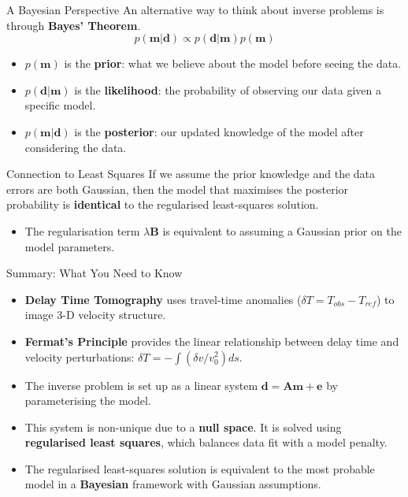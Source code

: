 \documentclass{beamer}
\begin{document}

\begin{frame}{A Bayesian Perspective}
    An alternative way to think about inverse problems is through \textbf{Bayes' Theorem}.
    $$ p(\mathbf{m}|\mathbf{d}) \propto p(\mathbf{d}|\mathbf{m})p(\mathbf{m}) $$
    \pause
    \begin{itemize}
        \item $ p(\mathbf{m}) $ is the \textbf{prior}: what we believe about the model before seeing the data.
        \item $ p(\mathbf{d}|\mathbf{m}) $ is the \textbf{likelihood}: the probability of observing our data given a specific model.
        \item $ p(\mathbf{m}|\mathbf{d}) $ is the \textbf{posterior}: our updated knowledge of the model after considering the data.
    \end{itemize}
    \pause
    \begin{alertblock}{Connection to Least Squares}
        If we assume the prior knowledge and the data errors are both Gaussian, then the model that maximises the posterior probability is \textbf{identical} to the regularised least-squares solution.
        \begin{itemize}
            \item The regularisation term $ \lambda\mathbf{B} $ is equivalent to assuming a Gaussian prior on the model parameters.
        \end{itemize}
    \end{alertblock}
\end{frame}


\begin{frame}{Summary: What You Need to Know}
    \begin{itemize}
        \item \textbf{Delay Time Tomography} uses travel-time anomalies ($ \delta T = T_{obs} - T_{ref} $) to image 3-D velocity structure.
        \pause
        \item \textbf{Fermat's Principle} provides the linear relationship between delay time and velocity perturbations: $ \delta T = -\int (\delta v / v_0^2) ds $.
        \pause
        \item The inverse problem is set up as a linear system $ \mathbf{d} = \mathbf{A}\mathbf{m} + \mathbf{e} $ by parameterising the model.
        \pause
        \item This system is non-unique due to a \textbf{null space}. It is solved using \textbf{regularised least squares}, which balances data fit with a model penalty.
        \pause
        \item The regularised least-squares solution is equivalent to the most probable model in a \textbf{Bayesian} framework with Gaussian assumptions.
    \end{itemize}
\end{frame}
\end{document}

